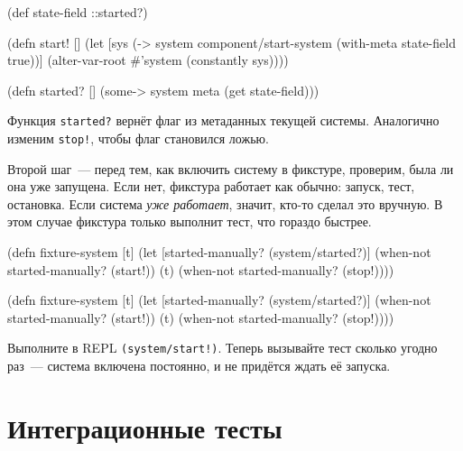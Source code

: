 \else

\begin{english}
  \begin{clojure}
(def state-field ::started?)

(defn start! []
  (let [sys (-> system
                component/start-system
                (with-meta {state-field true}))]
    (alter-var-root #'system (constantly sys))))

(defn started? []
  (some-> system meta (get state-field)))
  \end{clojure}
\end{english}

\fi

Функция \verb|started?| вернёт флаг из метаданных текущей системы. Аналогично
изменим \verb|stop!|, чтобы флаг становился ложью.

Второй шаг~--- перед тем, как включить систему в фикстуре, проверим, была ли она
уже запущена. Если нет, фикстура работает как обычно: запуск, тест,
остановка. Если система \emph{уже работает}, значит, кто-то сделал это
вручную. В этом случае фикстура только выполнит тест, что гораздо быстрее.

\ifx\DEVICETYPE\MOBILE

\begin{english}
  \begin{clojure}
(defn fixture-system [t]
  (let [started-manually?
        (system/started?)]
    (when-not started-manually?
      (start!))
    (t)
    (when-not started-manually?
      (stop!))))
  \end{clojure}
\end{english}

\else

\begin{english}
  \begin{clojure}
(defn fixture-system [t]
  (let [started-manually? (system/started?)]
    (when-not started-manually?
      (start!))
    (t)
    (when-not started-manually?
      (stop!))))
  \end{clojure}
\end{english}

\fi

Выполните в REPL \verb|(system/start!)|. Теперь вызывайте тест сколько угодно
раз~--- система включена постоянно, и не придётся ждать её запуска.

\section{Интеграционные тесты}

